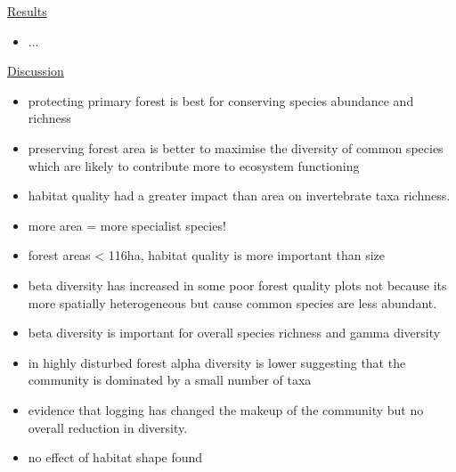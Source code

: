 \underline{Results}
\begin{itemize}
	\item ...
\end{itemize}

\underline{Discussion}
\begin{itemize}
	\item protecting primary forest is best for conserving species abundance and richness
	\item preserving forest area is better to maximise the diversity of common species which are likely to contribute more to ecosystem functioning
	\item habitat quality had a greater impact than area on invertebrate taxa richness.
	\item more area = more specialist species!
	\item forest areas < 116ha, habitat quality is more important than size  
	\item beta diversity has increased in some poor forest quality plots not because its more spatially heterogeneous but cause common species are less abundant.
	\item beta diversity is important for overall species richness and gamma diversity
	\item in highly disturbed forest alpha diversity is lower suggesting that the community is dominated by a small number of taxa
	\item evidence that logging has changed the makeup of the community but no overall reduction in diversity.
	\item no effect of habitat shape found
\end{itemize}